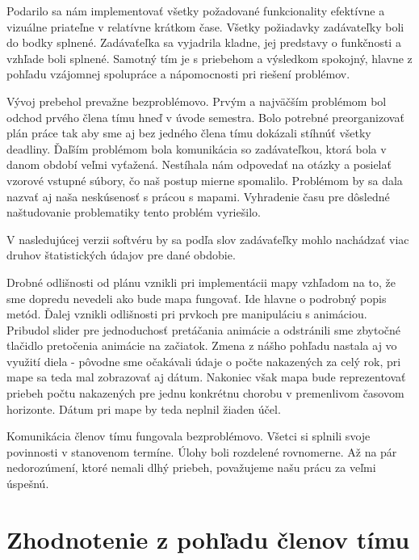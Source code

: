\documentclass[12pt,a4paper]{report}
\begin{document}
	Podarilo sa nám implementovať všetky požadované funkcionality efektívne a vizuálne priateľne v relatívne krátkom čase. Všetky požiadavky zadávateľky boli do bodky splnené. Zadávaťeľka sa vyjadrila kladne, jej predstavy o funkčnosti a vzhľade boli splnené. Samotný tím je s priebehom a výsledkom spokojný, hlavne z pohľadu vzájomnej spolupráce a nápomocnosti pri riešení problémov.
	\par
	Vývoj prebehol prevažne bezproblémovo. Prvým a najväčším problémom bol odchod prvého člena tímu hneď v úvode semestra. Bolo potrebné preorganizovať plán práce tak aby sme aj bez jedného člena tímu dokázali stíhnúť všetky deadliny. Ďaľším problémom bola komunikácia so zadávateľkou, ktorá bola v danom období veľmi vyťažená. Nestíhala nám odpovedať na otázky a posielať vzorové vstupné súbory, čo naš postup mierne spomalilo. Problémom by sa dala nazvať aj naša neskúsenosť s prácou s mapami. Vyhradenie času pre dôsledné naštudovanie problematiky tento problém vyriešilo. 
	\par
	V nasledujúcej verzii softvéru by sa podľa slov zadávaťeľky mohlo nachádzať viac druhov štatistických údajov pre dané obdobie. 
	\par
	Drobné odlišnosti od plánu vznikli pri implementácii mapy vzhľadom na to, že sme dopredu nevedeli ako bude mapa fungovať. Ide hlavne o podrobný popis metód. Ďalej vznikli odlišnosti pri prvkoch pre manipuláciu s animáciou. Pribudol slider pre jednoduchosť pretáčania animácie a odstránili sme zbytočné tlačidlo pretočenia animácie na začiatok. Zmena z nášho pohľadu nastala aj vo využití diela - pôvodne sme očakávali údaje o počte nakazených za celý rok, pri mape sa teda mal zobrazovať aj dátum. Nakoniec však mapa bude reprezentovať priebeh počtu nakazených pre jednu konkrétnu chorobu v premenlivom časovom horizonte. Dátum pri mape by teda neplnil žiaden účel.
	\par
	Komunikácia členov tímu fungovala bezproblémovo. Všetci si splnili svoje povinnosti v stanovenom termíne. Úlohy boli rozdelené rovnomerne. Až na pár nedorozúmení, ktoré nemali dlhý priebeh, považujeme našu prácu za veľmi úspešnú.

\section[Zhodnotenie z pohľadu členov tímu]{\rmfamily\bfseries
	Zhodnotenie z pohľadu členov tímu}
\end{document}

